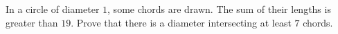 In a circle of diameter $ 1$,  some chords are drawn. The sum of their lengths is greater than $ 19$. Prove that there is a diameter intersecting at least $ 7$ chords.
